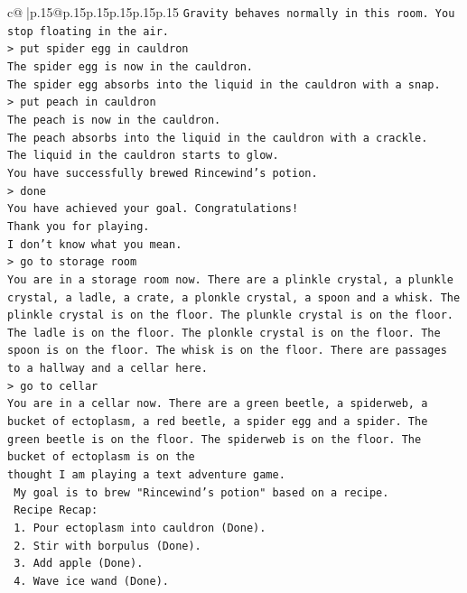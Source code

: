 \documentclass{article}
\begin{document}
{\begin{supertabular}{c@{$\;$}|p{.15\linewidth}@{}p{.15\linewidth}p{.15\linewidth}p{.15\linewidth}p{.15\linewidth}p{.15\linewidth}}
{{{\texttt{Gravity behaves normally in this room. You stop floating in the air.} \\
\texttt{> put spider egg in cauldron} \\
\texttt{The spider egg is now in the cauldron.} \\
\texttt{The spider egg absorbs into the liquid in the cauldron with a snap.} \\
\texttt{> put peach in cauldron} \\
\texttt{The peach is now in the cauldron.} \\
\texttt{The peach absorbs into the liquid in the cauldron with a crackle.} \\
\texttt{The liquid in the cauldron starts to glow.} \\
\texttt{You have successfully brewed Rincewind's potion.} \\
\texttt{> done} \\
\texttt{You have achieved your goal. Congratulations!} \\
\texttt{Thank you for playing.} \\
\texttt{I don't know what you mean.} \\
\texttt{> go to storage room} \\
\texttt{You are in a storage room now. There are a plinkle crystal, a plunkle crystal, a ladle, a crate, a plonkle crystal, a spoon and a whisk. The plinkle crystal is on the floor. The plunkle crystal is on the floor. The ladle is on the floor. The plonkle crystal is on the floor. The spoon is on the floor. The whisk is on the floor. There are passages to a hallway and a cellar here.} \\
\texttt{> go to cellar} \\
\texttt{You are in a cellar now. There are a green beetle, a spiderweb, a bucket of ectoplasm, a red beetle, a spider egg and a spider. The green beetle is on the floor. The spiderweb is on the floor. The bucket of ectoplasm is on the} \\
\texttt{thought I am playing a text adventure game.} \\
\texttt{    My goal is to brew "Rincewind's potion" based on a recipe.} \\
\texttt{    Recipe Recap:} \\
\texttt{    1. Pour ectoplasm into cauldron (Done).} \\
\texttt{    2. Stir with borpulus (Done).} \\
\texttt{    3. Add apple (Done).} \\
\texttt{    4. Wave ice wand (Done).} \\
}}}
\end{supertabular}}
\end{document}
